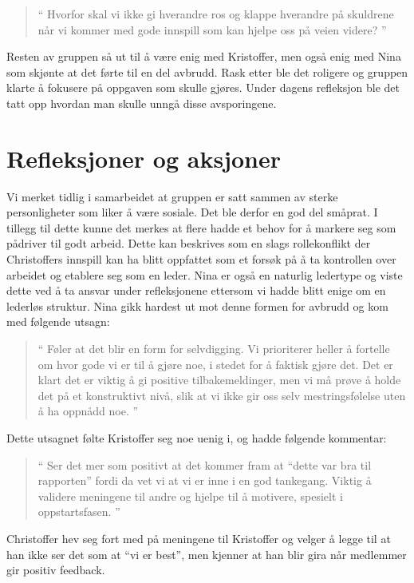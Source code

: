 \begin{quote}``
Hvorfor skal vi ikke gi hverandre ros og klappe hverandre på skuldrene når vi kommer med gode innspill som kan hjelpe oss på veien videre?
''\end{quote} 

Resten av gruppen så ut til å være enig med Kristoffer, men også enig med Nina som skjønte at det førte til en del avbrudd. Rask etter ble det roligere og gruppen klarte å fokusere på oppgaven som skulle gjøres. Under dagens refleksjon ble det tatt opp hvordan 
man skulle unngå disse avsporingene. 

\section{Refleksjoner og aksjoner}

Vi merket tidlig i samarbeidet at gruppen er satt sammen av sterke personligheter som liker å være sosiale. Det ble derfor en god del småprat. I 
tillegg til dette kunne det merkes at flere hadde et behov for å markere seg som pådriver til godt arbeid. Dette kan beskrives som en slags 
rollekonflikt \cite{Artikkel2} der Christoffers innspill kan ha blitt oppfattet som et forsøk på å ta kontrollen over arbeidet og etablere seg som en 
leder. Nina er også en naturlig ledertype og viste dette ved å ta ansvar under refleksjonene ettersom vi hadde blitt enige om en lederløs 
struktur. Nina gikk hardest ut mot denne formen for avbrudd og kom med følgende utsagn: 

\begin{quote}``
Føler at det blir en form for selvdigging. Vi prioriterer heller å fortelle om hvor gode vi er til å gjøre noe, i 
stedet for å faktisk gjøre det. Det er klart det er viktig å gi positive tilbakemeldinger, men vi må prøve å holde det på et konstruktivt nivå, slik at vi ikke gir oss selv mestringsfølelse uten å ha oppnådd noe.
''\end{quote} 

Dette utsagnet følte Kristoffer seg noe uenig i, og hadde følgende kommentar:

\begin{quote}``
Ser det mer som positivt at det kommer fram at ``dette 
var bra til rapporten'' fordi da vet vi at vi er inne i en god tankegang. Viktig å validere meningene til andre og hjelpe til å motivere, spesielt i oppstartsfasen. 
''\end{quote}  
Christoffer hev seg fort med på meningene til Kristoffer og velger å legge til at han ikke ser det som at ``vi er best'', men kjenner at han 
blir gira når medlemmer gir positiv feedback. 

